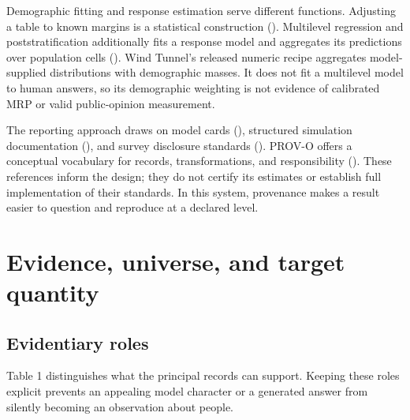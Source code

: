 \documentclass[
  11pt,
]{article}
\let\originalsection\section
\renewcommand{\section}{\Needspace{5\baselineskip}\originalsection}
\begin{document}
Demographic fitting and response estimation serve different functions.
Adjusting a table to known margins is a statistical construction
(). Multilevel
regression and poststratification additionally fits a response model and
aggregates its predictions over population cells
(). Wind Tunnel's
released numeric recipe aggregates model-supplied distributions with
demographic masses. It does not fit a multilevel model to human answers,
so its demographic weighting is not evidence of calibrated MRP or valid
public-opinion measurement.

The reporting approach draws on model cards
(), structured
simulation documentation (),
and survey disclosure standards (). PROV-O offers a
conceptual vocabulary for records, transformations, and responsibility
(). These
references inform the design; they do not certify its estimates or
establish full implementation of their standards. In this system,
provenance makes a result easier to question and reproduce at a declared
level.

\section{Evidence, universe, and target
quantity}\label{evidence-universe-and-target-quantity}

\subsection{Evidentiary roles}\label{evidentiary-roles}

Table 1 distinguishes what the principal records can support. Keeping
these roles explicit prevents an appealing model character or a
generated answer from silently becoming an observation about people.
\end{document}
